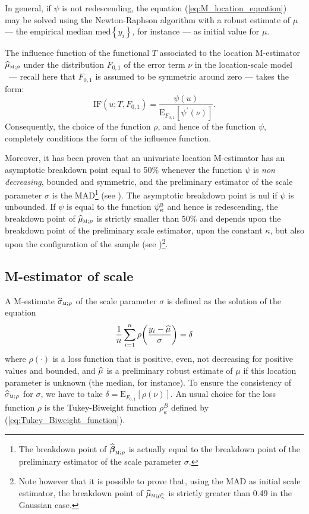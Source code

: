 In general, if $\psi$ is not redescending, the equation
(\ref{eq:M_location_equation}) may be solved using the Newton-Raphson
algorithm with a robust estimate of $\mu$ --- the empirical median
$\mathrm{med}\left\{  y_{i}\right\}  $, for instance --- as initial value for
$\mu$.

The influence function of the functional $T$ associated to the location
M-estimator $\sthat{\mu}_{\stsc{M};\rho}$ under the distribution $F_{0,1}$
of the error term $\nu$ in the location-scale model \ --- recall here that
$F_{0,1}$ is assumed to be symmetric around zero --- takes the form:
\[
\mathrm{IF}\left(  u;T,F_{0,1}\right)  =\frac{\psi(u)}{\mathrm{E}_{F_{0,1}%
}\left[  \psi^{\prime}\left(  \nu\right)  \right]  }.
\]
Consequently, the choice of the function $\rho$, and hence of the function
$\psi$, completely conditions the form of the influence function.

Moreover, it has been proven that an univariate location M-estimator has an
asymptotic breakdown point equal to 50\% whenever the function $\psi$ is
\emph{non decreasing}, bounded and symmetric, and the preliminary estimator of
the scale parameter $\sigma$ is the MAD\footnote{The breakdown point of
$\sthat{\boldsymbol\beta}_{\stsc{M};\rho}$ is actually equal to the
breakdown point of the preliminary estimator of the scale parameter $\sigma$.}
(see \citealp[54]{Huber:2009}). The asymptotic breakdown point is
nul if $\psi$ is unbounded. If $\psi$ is equal to the function $\psi_{\kappa
}^{\stsc{B}}$ and hence is redescending, the breakdown point of
$\sthat{\mu}_{\stsc{M};\rho}$ is strictly smaller than 50\% and depends
upon the breakdown point of the preliminary scale estimator, upon the constant
$\kappa$, but also upon the configuration of the sample (see
\citealp[78]{maronna:etal:2006})\footnote{Note however that it is
possible to prove that, using the MAD as initial scale estimator, the
breakdown point of $\sthat{\mu}_{\stsc{M};\rho_{\kappa}^{\stsc{B}}}$ is
strictly greater than 0.49 in the Gaussian case.}.

\subsection{M-estimator of scale}

A M-estimate $\sthat{\sigma}_{\stsc{M};\rho}$ of the scale parameter
$\sigma$ is defined as the solution of the equation
\begin{equation}
\frac{1}{n}\sum_{i=1}^{n}\rho\left(  \frac{y_{i}-\sthat{\mu}}{\sigma
}\right)  =\delta\label{eq:M_scale_loc_equation}%
\end{equation}
where $\rho\left(  \cdot\right)  $ is a loss function that is positive, even,
not decreasing for positive values and bounded, and $\widehat{\mu}$ is a
preliminary robust estimate of $\mu$ if this location parameter is unknown
(the median, for instance). To ensure the consistency of $\sthat{\sigma
}_{\stsc{M};\rho}$ for $\sigma$, we have to take $\delta=\mathrm{E}%
_{F_{0,1}}\left[  \rho\left(  \nu\right)  \right]  $. An usual choice for the
loss function $\rho$ is the Tukey-Biweight function $\rho_{\kappa}^{B}$
defined by (\ref{eq:Tukey_Biweight_function}).

